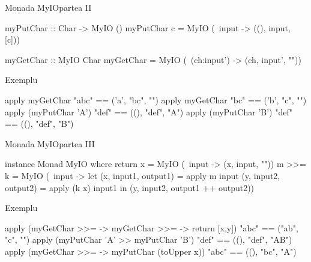 \documentclass[xcolor=pdftex,romanian,colorlinks]{beamer}
\begin{document}
\begin{frame}[fragile]{Monada MyIO}{partea II}
\begin{asciihs}
 myPutChar :: Char -> MyIO ()
 myPutChar c = MyIO (\ input -> ((), input, [c]))

 myGetChar :: MyIO Char
 myGetChar = MyIO (\ (ch:input') -> (ch, input', ""))
\end{asciihs}

\begin{block}
{Exemplu}
\begin{asciihs}
   apply myGetChar "abc" == ('a',    "bc", "")
   apply myGetChar "bc"   == ('b',   "c", "")
   apply (myPutChar 'A') "def" ==    ((), "def", "A")
   apply (myPutChar 'B') "def" ==    ((), "def", "B")
\end{asciihs}
\end{block}

\end{frame}



\begin{frame}[fragile]{Monada MyIO}{partea III}
\begin{asciihs}
   instance Monad MyIO where
     return x = MyIO (\ input -> (x, input, ""))
     m >>= k  = MyIO (\ input ->
        let (x, input1, output1) = apply m input
            (y, input2, output2) = apply (k x) input1 
         in (y, input2, output1 ++ output2))
\end{asciihs}

\begin{block}
{Exemplu}
\vspace{-2ex}
\begin{asciihs}
   apply
     (myGetChar >>= \x -> myGetChar >>= \y -> return [x,y])
     "abc"
   == ("ab", "c", "")
   apply (myPutChar 'A' >> myPutChar 'B') "def"
   == ((), "def", "AB")
   apply (myGetChar >>= \x -> myPutChar (toUpper x)) "abc"
   == ((), "bc", "A")
\end{asciihs}
\end{block}

\end{frame}


%
\end{document}
